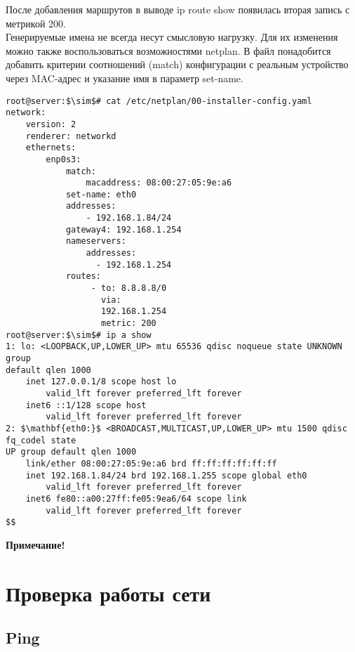 \documentclass[14pt, a4paper]{article}
\begin{document}
После добавления маршрутов в выводе \colorbox{backcolour}{ip route show} появилась вторая запись с метрикой 200.\\

Генерируемые имена не всегда несут смысловую нагрузку. Для их изменения можно также
воспользоваться возможностями netplan. В файл понадобится добавить критерии соотношений
(\colorbox{backcolour}{match}) конфигурации с реальным устройство через MAC-адрес и указание имя в параметр
\colorbox{backcolour}{set-name}.

\vspace{0.3cm}
\begin{lstlisting}
root@server:$\sim$# cat /etc/netplan/00-installer-config.yaml
network:
    version: 2
    renderer: networkd
    ethernets:
        enp0s3:
            match:
                macaddress: 08:00:27:05:9e:a6
            set-name: eth0
            addresses:
                - 192.168.1.84/24
            gateway4: 192.168.1.254
            nameservers:
                addresses:
                  - 192.168.1.254
            routes:
                 - to: 8.8.8.8/0
                   via:
                   192.168.1.254
                   metric: 200
root@server:$\sim$# ip a show
1: lo: <LOOPBACK,UP,LOWER_UP> mtu 65536 qdisc noqueue state UNKNOWN group
default qlen 1000
    inet 127.0.0.1/8 scope host lo
        valid_lft forever preferred_lft forever
    inet6 ::1/128 scope host
        valid_lft forever preferred_lft forever
2: $\mathbf{eth0:}$ <BROADCAST,MULTICAST,UP,LOWER_UP> mtu 1500 qdisc fq_codel state 
UP group default qlen 1000
    link/ether 08:00:27:05:9e:a6 brd ff:ff:ff:ff:ff:ff
    inet 192.168.1.84/24 brd 192.168.1.255 scope global eth0
        valid_lft forever preferred_lft forever
    inet6 fe80::a00:27ff:fe05:9ea6/64 scope link
        valid_lft forever preferred_lft forever
$$
\end{lstlisting}
\vspace{0.2cm}

\textbf{Примечание!} \\

\newpage

\section*{Проверка работы сети} 

\subsection*{Ping} 
\end{document}

